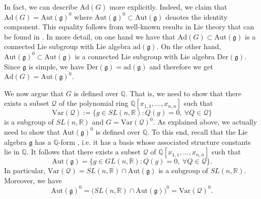 \documentclass[11pt, letterpaper, oneside,reqno]{amsart}
\theoremstyle{plain}
\theoremstyle{underline}
\theoremstyle{definition}
\theoremstyle{remark}
\begin{document}
In fact, we can describe $\text{Ad}(G)$ more explicitly. Indeed, we claim that $\text{Ad}(G)=\text{Aut}(\mathfrak{g})^{0}$ where $\text{Aut}(\mathfrak{g})^{0}\subset\text{Aut}(\mathfrak{g})$ denotes the identity component. This equality follows from well-known results in Lie theory that can be found in \cite[Chapter I, \S 14]{Knapp}. In more detail, on one hand we have that $\text{Ad}(G)\subset\text{Aut}(\mathfrak{g})$ is a connected Lie subgroup with Lie algebra $\text{ad}(\mathfrak{g})$. On the other hand, $\text{Aut}(\mathfrak{g})^{0}\subset\text{Aut}(\mathfrak{g})$ is a connected Lie subgroup with Lie algebra $\text{Der}(\mathfrak{g})$. Since $\mathfrak{g}$ is simple, we have $\text{Der}(\mathfrak{g})=\text{ad}(\mathfrak{g})$ and therefore we get $\text{Ad}(G)=\text{Aut}(\mathfrak{g})^{0}$.
	
	We now argue that $G$ is defined over $\mathbb{Q}$. That is, we need to show that there exists a subset $\mathcal{Q}$ of the polynomial ring $\mathbb{Q}[x_{1,1},\ldots,x_{n,n}]$ such that
	\[
	\text{Var}(\mathcal{Q}):=\{g\in SL(n,\mathbb{R}): Q(g)=0,\ \forall Q\in\mathcal{Q}\}
	\]
	is a subgroup of $SL(n,\mathbb{R})$ and $G=\text{Var}(\mathcal{Q})^{0}$.  
	 As explained above, we actually need to show that $\text{Aut}(\mathfrak{g})^{0}$ is defined over $\mathbb{Q}$. To this end, recall that the Lie algebra $\mathfrak{g}$ has a $\mathbb{Q}$-form \cite[Rem.~13]{Cornulier}, i.e. it has a basis whose associated structure constants lie in $\mathbb{Q}$. It follows that there exists a subset $\mathcal{Q}$ of $\mathbb{Q}[x_{1,1},\ldots,x_{n,n}]$ such that 
	\[
	\text{Aut}(\mathfrak{g})=\{g\in GL(n,\mathbb{R}): Q(g)=0,\ \forall Q\in\mathcal{Q}\}.
	\]
	In particular, $\text{Var}(\mathcal{Q})=SL(n,\mathbb{R})\cap \text{Aut}(\mathfrak{g})$ is a subgroup of $SL(n,\mathbb{R})$. Moreover, we have
	\[
	\text{Aut}(\mathfrak{g})^{0}=\big(SL(n,\mathbb{R})\cap \text{Aut}(\mathfrak{g})\big)^{0}=\text{Var}(\mathcal{Q})^{0}.
	\]
\end{document}
